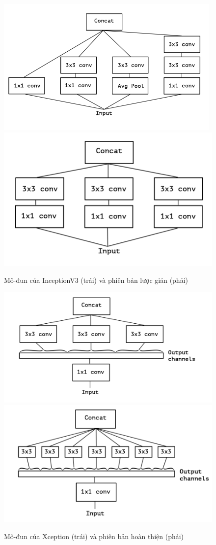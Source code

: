 \documentclass[a4paper,14pt]{extarticle}
\begin{document}
	\begin{figure}[H]
		\centering
		\includegraphics[scale=0.7]{images/inceptionv3.png}
		\includegraphics[scale=0.7]{images/simplified_inceptionv3.png}
		\caption{Mô-đun của InceptionV3 (trái) và phiên bản lược giản (phải)}
	\end{figure}

	\begin{figure}[H]
		\centering
		\includegraphics[scale=0.63]{images/strict_equivalent.png}
		\includegraphics[scale=0.63]{images/xception.png}
		\caption{Mô-đun của Xception (trái) và phiên bản hoàn thiện (phải)}
	\end{figure}
\end{document}
